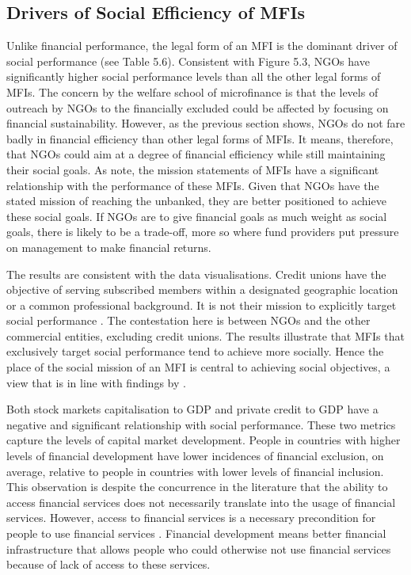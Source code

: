 \documentclass[a4paper, nobind]{templates/ociamthesis}
\begin{document}
\newpage

\hypertarget{drivers-of-social-efficiency-of-mfis}{%
\subsection{Drivers of Social Efficiency of MFIs}\label{drivers-of-social-efficiency-of-mfis}}

Unlike financial performance, the legal form of an MFI is the dominant driver of social performance (see Table 5.6). Consistent with Figure 5.3, NGOs have significantly higher social performance levels than all the other legal forms of MFIs. The concern by the welfare school of microfinance is that the levels of outreach by NGOs to the financially excluded could be affected by focusing on financial sustainability. However, as the previous section shows, NGOs do not fare badly in financial efficiency than other legal forms of MFIs. It means, therefore, that NGOs could aim at a degree of financial efficiency while still maintaining their social goals. As \textcite{mersland2019social} note, the mission statements of MFIs have a significant relationship with the performance of these MFIs. Given that NGOs have the stated mission of reaching the unbanked, they are better positioned to achieve these social goals. If NGOs are to give financial goals as much weight as social goals, there is likely to be a trade-off, more so where fund providers put pressure on management to make financial returns.

The results are consistent with the data visualisations. Credit unions have the objective of serving subscribed members within a designated geographic location or a common professional background. It is not their mission to explicitly target social performance \autocite{mathuva2017achieving}. The contestation here is between NGOs and the other commercial entities, excluding credit unions. The results illustrate that MFIs that exclusively target social performance tend to achieve more socially. Hence the place of the social mission of an MFI is central to achieving social objectives, a view that is in line with findings by \textcite{berbegal2019impact}.

Both stock markets capitalisation to GDP and private credit to GDP have a negative and significant relationship with social performance. These two metrics capture the levels of capital market development. People in countries with higher levels of financial development have lower incidences of financial exclusion, on average, relative to people in countries with lower levels of financial inclusion. This observation is despite the concurrence in the literature that the ability to access financial services does not necessarily translate into the usage of financial services. However, access to financial services is a necessary precondition for people to use financial services \autocite{allen2013resolving,jarotschkin2013microfinance}. Financial development means better financial infrastructure that allows people who could otherwise not use financial services because of lack of access to these services.
\end{document}
